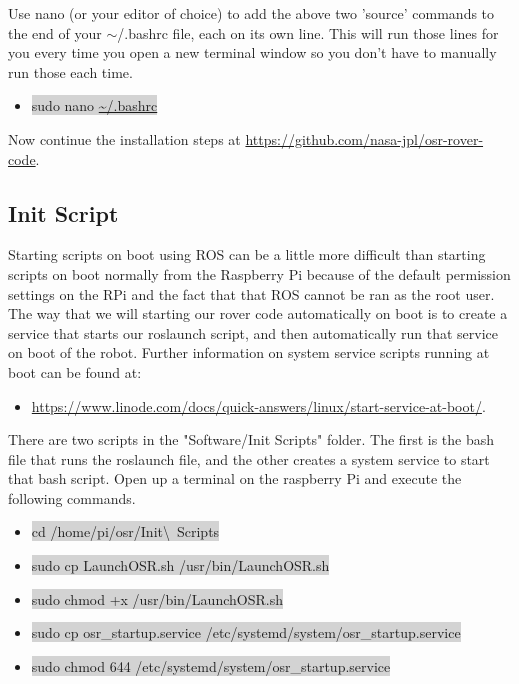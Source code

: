 \documentclass{article}
\begin{document}
\noindent Use nano (or your editor of choice) to add the above two 'source' commands to the end of your $\sim$/.bashrc file, each on its own line. This will run those lines for you every time you open a new terminal window so you don't have to manually run those each time.
\begin{itemize}
	\item[] \colorbox{lightgray}{sudo nano \url{~/.bashrc}}
\end{itemize}

Now continue the installation steps at \href{https://github.com/nasa-jpl/osr-rover-code}{https://github.com/nasa-jpl/osr-rover-code}.

\bigskip 

\subsection{Init Script}

Starting scripts on boot using ROS can be a little more difficult than starting scripts on boot normally from the Raspberry Pi because of the default permission settings on the RPi and the fact that that ROS cannot be ran as the root user. The way that we will starting our rover code automatically on boot is to create a service that starts our roslaunch script, and then automatically run that service on boot of the robot. Further information on system service scripts running at boot can be found at: 

\begin{itemize}
	\item \href{https://www.linode.com/docs/quick-answers/linux/start-service-at-boot/}{https://www.linode.com/docs/quick-answers/linux/start-service-at-boot/}. 
\end{itemize}

There are two scripts in the "Software/Init Scripts" folder. The first is the bash file that runs the roslaunch file, and the other creates a system service to start that bash script. Open up a terminal on the raspberry Pi and execute the following commands.

\begin{itemize}
	\item[] \colorbox{lightgray}{cd /home/pi/osr/Init\textbackslash\ Scripts}
	\item[] \colorbox{lightgray}{sudo cp LaunchOSR.sh /usr/bin/LaunchOSR.sh}
	\item[] \colorbox{lightgray}{sudo chmod +x /usr/bin/LaunchOSR.sh}
	\item[] \colorbox{lightgray}{sudo cp osr\_startup.service /etc/systemd/system/osr\_startup.service}
	\item[] \colorbox{lightgray}{sudo chmod 644 /etc/systemd/system/osr\_startup.service}
\end{itemize}
\end{document}
